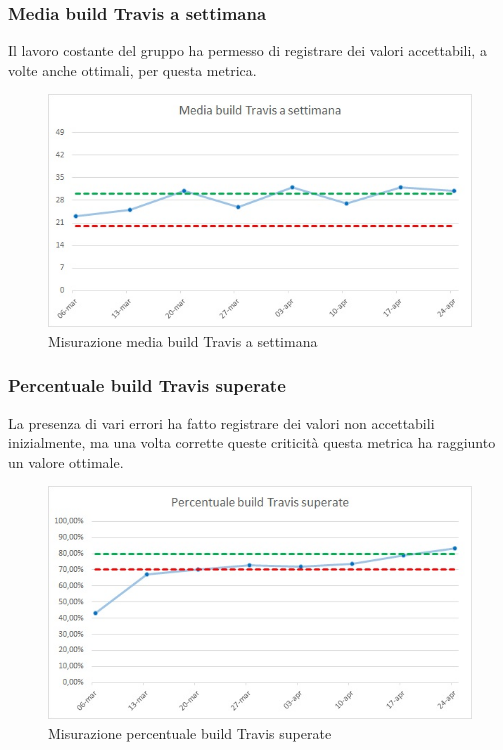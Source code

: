 \subsubsection{Media build Travis a settimana}
Il lavoro costante del gruppo ha permesso di registrare dei valori accettabili, a volte anche ottimali, per questa metrica.
\begin{figure} [H]
	\centering
	\includegraphics[scale=1]{Img/build}
	\caption{Misurazione media build Travis a settimana}\label{}
\end{figure}

\subsubsection{Percentuale build Travis superate}
La presenza di vari errori ha fatto registrare dei valori non accettabili inizialmente, ma una volta corrette queste criticità questa metrica ha raggiunto un valore ottimale.
\begin{figure} [H]
	\centering
	\includegraphics[scale=1]{Img/buildPass}
	\caption{Misurazione percentuale build Travis superate}\label{}
\end{figure}

